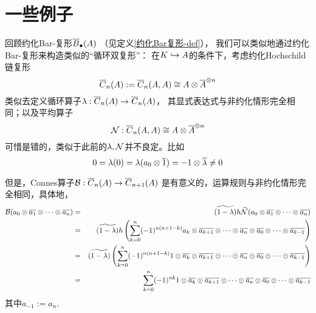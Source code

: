 

\section{一些例子}


回顾约化Bar-复形$\overline{B}_{\bullet}(A)$
（见定义\ref{约化Bar复形-def}），
我们可以类似地通过约化Bar-复形来构造类似的“循环双复形”：
在$K\hookrightarrow A$的条件下，考虑约化Hochschild链复形
$$\overline{C}_n(A):=
\overline{C}_n(A,A)\cong A\otimes\overline{A}^{\otimes n}$$
{\color{gray}
类似去定义循环算子$\lambda:\overline{C}_n(A)\to\overline{C}_n(A)$，
其显式表达式与非约化情形完全相同；以及平均算子
$$\mathcal{N}:\overline{C}_n(A,A)\cong A\otimes\overline{A}^{\otimes n}$$
}
{\color{red}
可惜是错的，类似于此前的$\lambda,\mathcal{N}$并不良定。比如
$$0=\lambda(0)=\lambda(a_0\otimes \overline{1})=-1\otimes\overline{\lambda}\neq 0$$
}

但是，Connes算子$\mathcal{B}:\overline{C}_n(A)\to\overline{C}_{n+1}(A)$
是有意义的，运算规则与非约化情形完全相同，具体地，
\begin{eqnarray*}
    \mathcal{B}(a_0\otimes\overline{a_1}\otimes\cdots\otimes\overline{a_n})
&=& \widetilde{(1-\lambda)}h\widetilde{\mathcal{N}}
    (a_0\otimes\overline{a_1}\otimes\cdots\otimes\overline{a_n})\\
&=& \widetilde{(1-\lambda)}h
      \left(
        \sum_{k=0}^n(-1)^{n(n+1-k)}
          a_k\otimes \overline{a_{k+1}}\otimes\cdots\otimes\overline{a_n}
          \otimes\overline{a_0}\otimes\cdots\otimes\overline{a_{k-1}}
      \right)\\
&=&   \widetilde{(1-\lambda)}
      \left(
        \sum_{k=0}^n(-1)^{n(n+1-k)}
          1\otimes\overline{a_k}\otimes \overline{a_{k+1}}
          \otimes\cdots\otimes\overline{a_n}
          \otimes\overline{a_0}\otimes\cdots\otimes\overline{a_{k-1}}
      \right)\\
&=&   \sum_{k=0}^n(-1)^{nk}
        1\otimes\overline{a_k}\otimes \overline{a_{k+1}}
         \otimes\cdots\otimes\overline{a_n}
         \otimes\overline{a_0}\otimes\cdots\otimes\overline{a_{k-1}}
\end{eqnarray*}
其中$a_{-1}:=a_n$.


